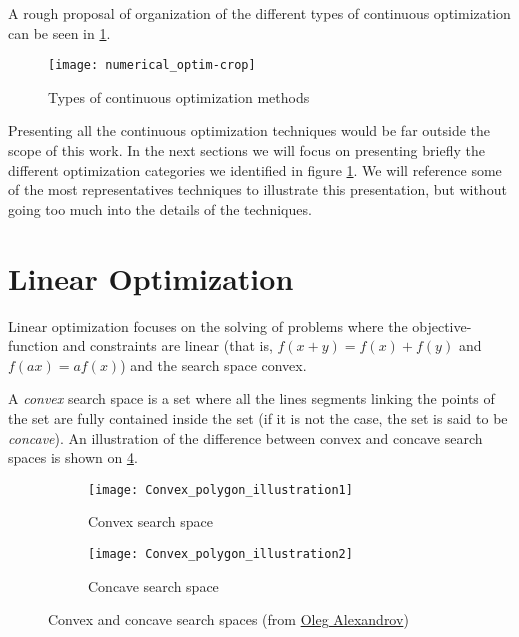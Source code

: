 A rough proposal of organization of the different types of continuous optimization can be seen in \ref{numerical_optim_tree}.

\begin{figure}
\texttt{[image: numerical\_optim-crop]}
\caption{Types of continuous optimization methods}
\label{numerical_optim_tree}
\end{figure}

Presenting all the continuous optimization techniques would be far outside the scope of this work. In the next sections we will focus on presenting briefly the different optimization categories we identified in figure \ref{numerical_optim_tree}. We will reference some of the most representatives techniques to illustrate this presentation, but without going too much into the details of the techniques.

\section{Linear Optimization}\label{linear_optim}

Linear optimization focuses on the solving of problems where the objective-function and constraints are linear (that is, $f(x+y) = f(x)+f(y)$ and $f(ax) = af(x)$) and the search space convex.

A \emph{convex} search space is a set where all the lines segments linking the points of the set are fully contained inside the set (if it is not the case, the set is said to be \emph{concave}). An illustration of the difference between convex and concave search spaces is shown on \figurename{} \ref{convexVSconcave}.

\begin{figure}
\centering
	\begin{subfigure}{0.35\textwidth}
		\centering
		\texttt{[image: Convex\_polygon\_illustration1]}
		\caption{Convex search space}\label{convexVSconcave:conc}
	\end{subfigure}
  	\begin{subfigure}{0.35\textwidth}
		\centering
		\texttt{[image: Convex\_polygon\_illustration2]}
		\caption{Concave search space}\label{convexVSconcave:conv}
	\end{subfigure}
	
	\caption{Convex and concave search spaces (from \href{http://commons.wikimedia.org/wiki/Category:Files_by_User:Oleg_Alexandrov_from_en.wikipedia}{Oleg Alexandrov})}
	\label{convexVSconcave}

\end{figure}

